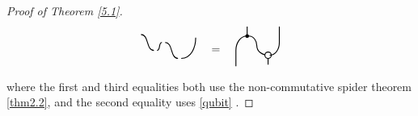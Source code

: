 \documentclass[10pt,a4paper]{amsart}
\newtheorem{scope}{Scope}
\begin{document}
\begin{proof}[Proof of Theorem \ref{5.1}]
\[\begin{tikzpicture}[thick, scale=0.5]
\begin{scope}[shift={(7,-1.5)}]
        \draw (-0.9,1) to [out=0,in=180] (-0.1,0);
        \draw (0.1,0) to [out=0,in=180] (0.4,0.5);
        \draw (0.6,0.5) to [out=0,in=180] (1.4,-0.5);
        \draw (1.6,-0.5) to [out=0,in=-90] (2.5,0.8);
    \end{scope}
    \node at (10.75, -1.5) {\large $=$};
    \begin{scope}[shift={(12,-3)}]
        \draw (0,0.5) -- (0,1.5) to [out=90,in=180] (0.7,2.4);
        \draw (0.7,2.4) -- (0.7,3); %
        \filldraw[black] (0.7,2.4) circle (2.5pt); %
        \draw (0.8,2.4) to [out=0,in=90] (1.3,1.8) to [out=-90,in=180] (2,1.2);
        \draw (2,1.2) -- (2,0.6);
        \node[draw, circle, fill=white, inner sep=2pt] at (2,1.2) {};
        \draw (2.1,1.2) to [out=0,in=-90] (2.7,2)-- (2.7,3);
    \end{scope}
\end{tikzpicture}
\]
\noindent where the first and third equalities both use the non-commutative spider theorem \ref{thm2.2}, and the second equality uses \ref{qubit} .
\end{proof}
\end{document}
